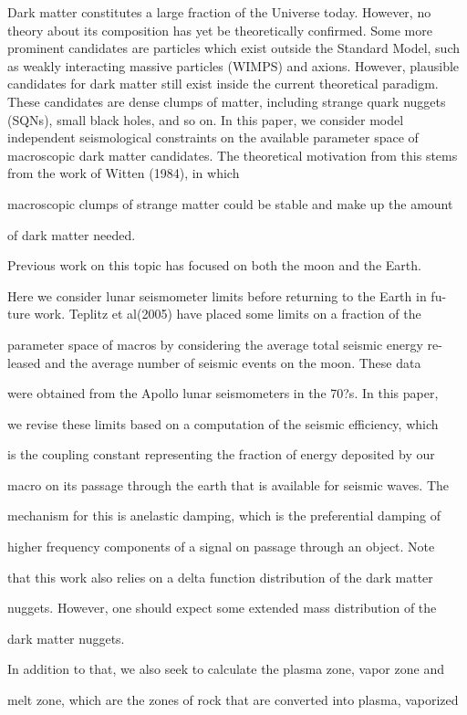 Dark matter constitutes a large fraction of the Universe today. However, no theory about its composition has yet be theoretically confirmed. Some more prominent candidates are particles which exist outside the Standard Model, such as weakly interacting massive particles (WIMPS) and axions. However, plausible candidates for dark matter still exist inside the current theoretical paradigm. These candidates are dense clumps of matter, including strange quark nuggets (SQNs), small black holes, and so on. In this paper, we consider model independent seismological constraints on the available parameter space of macroscopic dark matter candidates. The theoretical motivation from this stems from the work of Witten (1984), in which

macroscopic clumps of strange matter could be stable and make up the amount

of dark matter needed.

Previous work on this topic has focused on both the moon and the Earth.

Here we consider lunar seismometer limits before returning to the Earth in fu-
ture work. Teplitz et al(2005) have placed some limits on a fraction of the

parameter space of macros by considering the average total seismic energy re-
leased and the average number of seismic events on the moon. These data

were obtained from the Apollo lunar seismometers in the 70?s. In this paper,

we revise these limits based on a computation of the seismic efficiency, which

is the coupling constant representing the fraction of energy deposited by our

macro on its passage through the earth that is available for seismic waves. The

mechanism for this is anelastic damping, which is the preferential damping of

higher frequency components of a signal on passage through an object. Note

that this work also relies on a delta function distribution of the dark matter

nuggets. However, one should expect some extended mass distribution of the

dark matter nuggets.

In addition to that, we also seek to calculate the plasma zone, vapor zone and

melt zone, which are the zones of rock that are converted into plasma, vaporized

